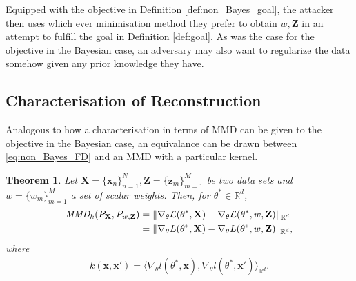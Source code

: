 \documentclass[hyperref]{article}
\theoremstyle{plain}
\newtheorem{theorem}{Theorem}[section]
\theoremstyle{remark}
\newcommand{\bx}{\mathbf{x}}
\newcommand{\bz}{\mathbf{z}}
\newcommand{\bX}{\mathbf{X}}
\newcommand{\bZ}{\mathbf{Z}}
\newcommand{\bbR}{\mathbb{R}}
\newcommand{\calL}{\mathcal{L}}
\begin{document}
Equipped with the objective in Definition \ref{def:non_Bayes_goal}, the attacker then uses which ever minimisation method they prefer to obtain $w,\bZ$ in an attempt to fulfill the goal in Definition \ref{def:goal}. As was the case for the objective in the Bayesian case, an adversary may also want to regularize the data somehow given any prior knowledge they have.

\subsection{Characterisation of Reconstruction}\label{subsec:non_bayesian_char}
Analogous to how a characterisation in terms of MMD can be given to the objective in the Bayesian case, an equivalance can be drawn between \eqref{eq:non_Bayes_FD} and an MMD with a particular kernel.

\begin{theorem}\label{thm:non_Bayes_characterise}
	Let $\bX = \{\bx_{n}\}_{n=1}^{N},\bZ = \{\bz_{m}\}_{m=1}^{M}$ be two data sets and $w = \{w_{m}\}_{m=1}^{M}$ a set of scalar weights. Then, for $\theta^{*}\in\bbR^{d}$,
	\begin{align*}
		\emph{MMD}_{k}(P_{\bX},P_{w,\bZ})  & = \lVert\nabla_{\theta}\calL(\theta^{*},\bX) - \nabla_{\theta}\calL(\theta^{*},w,\bZ)\rVert_{\bbR^{d}}\\
		& = \lVert\nabla_{\theta}L(\theta^{*},\bX) - \nabla_{\theta}L(\theta^{*},w,\bZ)\rVert_{\bbR^{d}},
	\end{align*}
where 
\begin{align*}
	k(\bx,\bx') = \langle \nabla_{\theta}l(\theta^{*},\bx), \nabla_{\theta}l(\theta^{*},\bx')\rangle_{\bbR^{d}}.
\end{align*}
\end{theorem}
\end{document}
